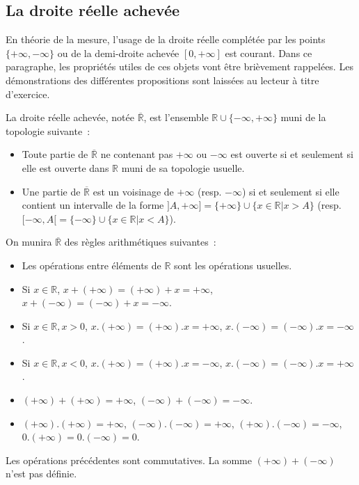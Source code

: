 \subsection{La droite réelle achevée}
En théorie de la mesure, l'usage de la droite réelle complétée par les
points $\{+\infty, -\infty \}$ ou de la demi-droite achevée $[0,
+\infty]$ est courant. Dans ce paragraphe, les propriétés utiles de
ces objets vont être brièvement rappelées. Les démonstrations des
différentes propositions sont laissées au lecteur à titre d'exercice.
\begin{defn}
La droite réelle achevée, notée $\overline{\mathbb{R}}$, est l'ensemble
$\mathbb{R} \cup \{ -\infty, +\infty \}$ muni de la topologie
suivante~:
\begin{itemize}
\item Toute partie de $\overline{\mathbb{R}}$ ne contenant pas
$+\infty$ ou $-\infty$ est ouverte si et seulement si elle est ouverte
dans $\mathbb{R}$ muni de sa topologie usuelle.
\item Une partie de  $\overline{\mathbb{R}}$ est un voisinage de
$+\infty$ (resp. $-\infty$) si et seulement si elle contient un
intervalle de la forme $]A, +\infty] = \{+\infty\} \cup \{ x \in
\mathbb{R} | x > A \}$ (resp. $[-\infty, A[ = \{-\infty\} \cup \{ x \in
\mathbb{R} | x < A \}$).
\end{itemize}
\end{defn}
On munira $\overline{\mathbb{R}}$ des règles arithmétiques suivantes~:
\begin{itemize}
\item Les opérations entre éléments de $\mathbb{R}$ sont les
opérations usuelles.
\item Si $x \in \mathbb{R}$, $x+(+\infty) = (+\infty) + x = +\infty$,
$x+(-\infty) = (-\infty) + x = -\infty$.
\item Si $x \in \mathbb{R}, x > 0$, $x.(+\infty) = (+\infty).x = +\infty$,
$x.(-\infty) = (-\infty) . x = -\infty$.
\item  Si $x \in \mathbb{R}, x < 0$, $x.(+\infty) = (+\infty).x = -\infty$,
$x.(-\infty) = (-\infty) . x = +\infty$.
\item $(+\infty)+(+\infty) = +\infty$,  $(-\infty)+(-\infty) =
-\infty$.
\item $(+\infty).(+\infty) = +\infty$, $(-\infty).(-\infty) =
+\infty$, $(+\infty).(-\infty) = -\infty$, $0.(+\infty)=0.(-\infty)=0$.
\end{itemize}
Les opérations précédentes sont commutatives. La somme
$(+\infty)+(-\infty)$ n'est pas définie.
